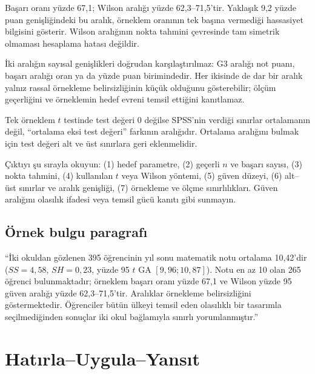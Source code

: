 Başarı oranı yüzde 67,1; Wilson aralığı yüzde 62,3--71,5'tir. Yaklaşık 9,2
yüzde puan genişliğindeki bu aralık, örneklem oranının tek başına vermediği
hassasiyet bilgisini gösterir. Wilson aralığının nokta tahmini çevresinde tam
simetrik olmaması hesaplama hatası değildir.

İki aralığın sayısal genişlikleri doğrudan karşılaştırılmaz: G3 aralığı not
puanı, başarı aralığı oran ya da yüzde puan birimindedir. Her ikisinde de dar
bir aralık yalnız rassal örnekleme belirsizliğinin küçük olduğunu gösterebilir;
ölçüm geçerliğini ve örneklemin hedef evreni temsil ettiğini kanıtlamaz.

\begin{mistakebox}
Tek örneklem $t$ testinde test değeri 0 değilse SPSS'nin verdiği sınırlar
ortalamanın değil, ``ortalama eksi test değeri'' farkının aralığıdır. Ortalama
aralığını bulmak için test değeri alt ve üst sınırlara geri eklenmelidir.
\end{mistakebox}

\begin{outputguidebox}
Çıktıyı şu sırayla okuyun: (1) hedef parametre, (2) geçerli $n$ ve başarı
sayısı, (3) nokta tahmini, (4) kullanılan $t$ veya Wilson yöntemi, (5) güven
düzeyi, (6) alt--üst sınırlar ve aralık genişliği, (7) örnekleme ve ölçme
sınırlılıkları. Güven aralığını olasılık ifadesi veya temsil gücü kanıtı gibi
sunmayın.
\end{outputguidebox}

\subsection{Örnek bulgu paragrafı}

``İki okuldan gözlenen 395 öğrencinin yıl sonu matematik notu ortalama
10,42'dir ($SS=4{,}58$, $SH=0{,}23$, yüzde 95 $t$ GA
$[9{,}96;10{,}87]$). Notu en az 10 olan 265 öğrenci bulunmaktadır; örneklem
başarı oranı yüzde 67,1 ve Wilson yüzde 95 güven aralığı yüzde
62,3--71,5'tir. Aralıklar örnekleme belirsizliğini göstermektedir. Öğrenciler
bütün ülkeyi temsil eden olasılıklı bir tasarımla seçilmediğinden sonuçlar iki
okul bağlamıyla sınırlı yorumlanmıştır.''





\section*{Hatırla--Uygula--Yansıt}

